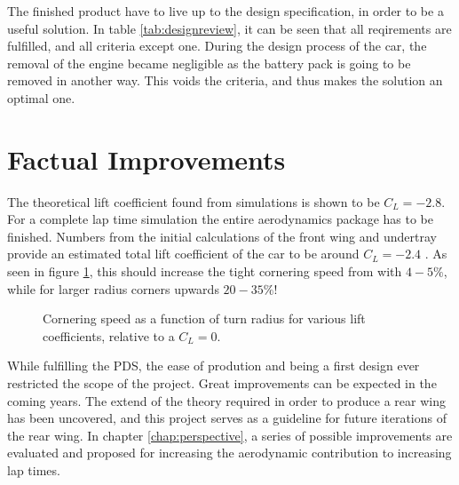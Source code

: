   The finished product have to live up to the design specification, in order to be a useful solution. In table \ref{tab:designreview}, it can be seen that all reqirements are fulfilled, and all criteria except one. During the design process of the car, the removal of the engine became negligible as the battery pack is going to be removed in another way. This voids the criteria, and thus makes the solution an optimal one.

  \section{Factual Improvements}

  The theoretical lift coefficient found from simulations is shown to be $C_L = -2.8$. For a complete lap time simulation the entire aerodynamics package has to be finished. Numbers from the initial calculations of the front wing and undertray provide an estimated total lift coefficient of the car to be around $C_L = -2.4$ \cite{CLvalues}. As seen in figure \ref{fig:cornerspeedvsliftrelative}, this should increase the tight cornering speed from with $4-5\%$, while for larger radius corners upwards $20-35\%$!

  \begin{figure}
    \caption{Cornering speed as a function of turn radius for various lift coefficients, relative to a $C_L = 0$.}
    \label{fig:cornerspeedvsliftrelative}
  \end{figure}

  While fulfilling the PDS, the ease of prodution and being a first design ever restricted the scope of the project. Great improvements can be expected in the coming years. The extend of the theory required in order to produce a rear wing has been uncovered, and this project serves as a guideline for future iterations of the rear wing.  In chapter \ref{chap:perspective}, a series of possible improvements are evaluated and proposed for increasing the aerodynamic contribution to increasing lap times.

